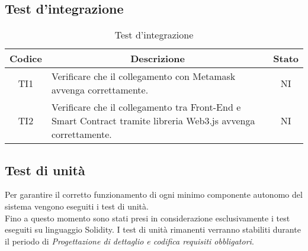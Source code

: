 \subsection{Test d'integrazione}\label{subsection:test_integrazione}
\begin{table}[H]
  \centering
  \renewcommand{\arraystretch}{1.8}
  \begin{tabular}{c|p{8cm}|c}
    \rowcolor[HTML]{125E28}
    \color[HTML]{FFFFFF}\textbf{Codice}
        & \multicolumn{1}{c}{\color[HTML]{FFFFFF}\textbf{Descrizione}}
        & \color[HTML]{FFFFFF}\textbf{Stato}                                                                                       \\
    \hline
    TI1 & Verificare che il collegamento con Metamask avvenga correttamente.                                                  & NI \\
    TI2 & Verificare che il collegamento tra Front-End\glo{} e Smart Contract tramite libreria Web3.js\glo{} avvenga correttamente. & NI \\
  \end{tabular}
  \caption{Test d'integrazione}
\end{table}

\vspace{1cm}
\subsection{Test di unità}\label{subsection:test_unita}
Per garantire il corretto funzionamento di ogni minimo componente autonomo del sistema vengono eseguiti i test di unità. \\
Fino a questo momento sono stati presi in considerazione esclusivamente i test eseguiti su linguaggio Solidity\glo{}.
I test di unità rimanenti verranno stabiliti durante il periodo di \textit{Progettazione di dettaglio e codifica requisiti obbligatori}.


